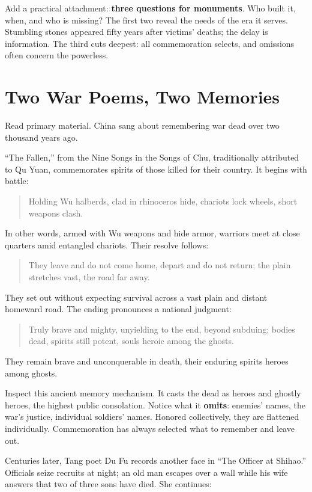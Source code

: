 Add a practical attachment: \textbf{three questions for monuments}. Who built it, when, and who is missing? The first two reveal the needs of the era it serves. Stumbling stones appeared fifty years after victims' deaths; the delay is information. The third cuts deepest: all commemoration selects, and omissions often concern the powerless.

\section{Two War Poems, Two Memories}
Read primary material. China sang about remembering war dead over two thousand years ago.

``The Fallen,'' from the Nine Songs in the Songs of Chu, traditionally attributed to Qu Yuan, commemorates spirits of those killed for their country. It begins with battle:

\begin{quote}
Holding Wu halberds, clad in rhinoceros hide, chariots lock wheels, short weapons clash.
\end{quote}
In other words, armed with Wu weapons and hide armor, warriors meet at close quarters amid entangled chariots. Their resolve follows:

\begin{quote}
They leave and do not come home, depart and do not return; the plain stretches vast, the road far away.
\end{quote}
They set out without expecting survival across a vast plain and distant homeward road. The ending pronounces a national judgment:

\begin{quote}
Truly brave and mighty, unyielding to the end, beyond subduing; bodies dead, spirits still potent, souls heroic among the ghosts.
\end{quote}
They remain brave and unconquerable in death, their enduring spirits heroes among ghosts.

Inspect this ancient memory mechanism. It casts the dead as heroes and ghostly heroes, the highest public consolation. Notice what it \textbf{omits}: enemies' names, the war's justice, individual soldiers' names. Honored collectively, they are flattened individually. Commemoration has always selected what to remember and leave out.

Centuries later, Tang poet Du Fu records another face in ``The Officer at Shihao.'' Officials seize recruits at night; an old man escapes over a wall while his wife answers that two of three sons have died. She continues:

